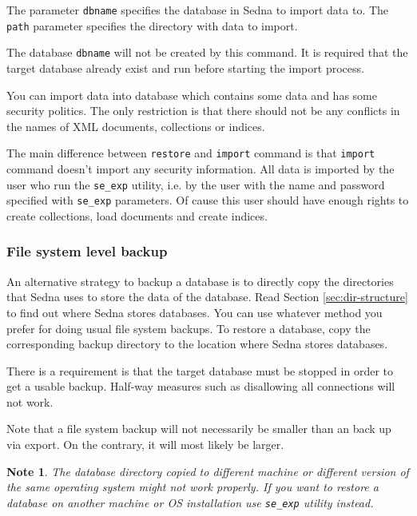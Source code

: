 \documentclass[a4paper,12pt]{article}
\newtheorem{note}{Note}
\begin{document}
The parameter \verb!dbname! specifies the database in Sedna to import data to. The \verb!path!
parameter specifies the directory with data to import. 

The database \verb!dbname! will not be created by this command. It is required that the target database 
already exist and run before starting the import process. 

You can import data into database which contains some data and has some security politics. The only
restriction is that there should not be any conflicts in the names of XML documents, collections or
indices. 

The main difference between \verb!restore! and \verb!import! command is that \verb!import! command 
doesn't import any security information. All data is imported by the user who run the \verb!se_exp! 
utility, i.e. by the user with the name and password specified with \verb!se_exp! parameters. Of cause 
this user should have enough rights to create collections, load documents and create indices.






\subsubsection{File system level backup}

An alternative strategy to backup a database is to directly copy the directories that Sedna
uses to store the data of the database. Read Section \ref{sec:dir-structure} to find out where
Sedna stores databases. You can use whatever method you prefer for doing usual file system backups.
To restore a database, copy the corresponding backup directory to the location where Sedna stores
databases.

There is a requirement is that the target database must be stopped in order to get a usable backup.
Half-way measures such as disallowing all connections will not work.

Note that a file system backup will not necessarily be smaller than an back up via export. On 
the contrary, it will most likely be larger.

\begin{note}
The database directory copied to different machine or different version of the same operating system 
might not work properly. If you want to restore a database on another machine or OS installation use
\verb!se_exp! utility instead.
\end{note}
\end{document}
